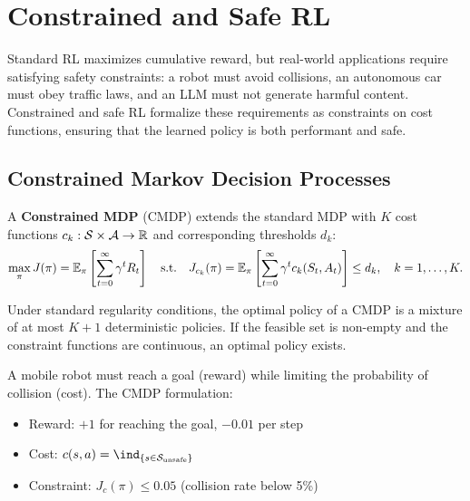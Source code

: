 \chapter{Constrained and Safe RL}
\label{ch:constrained}

\begin{intuition}
Standard RL maximizes cumulative reward, but real-world applications
require satisfying safety constraints: a robot must avoid collisions,
an autonomous car must obey traffic laws, and an LLM must not generate
harmful content. Constrained and safe RL formalize these requirements
as constraints on cost functions, ensuring that the learned policy is
both performant and safe.
\end{intuition}

\section{Constrained Markov Decision Processes}
\label{sec:cmdp}

\begin{definition}
A \textbf{Constrained MDP} (CMDP) extends the standard MDP with $K$
cost functions $c_k: \mathcal{S} \times \mathcal{A} \to \mathbb{R}$ and
corresponding thresholds $d_k$:
\[
    \max_\pi J(\pi) = \mathbb{E}_\pi\left[\sum_{t=0}^{\infty} \gamma^t R_t\right]
    \quad \text{s.t.} \quad
    J_{c_k}(\pi) = \mathbb{E}_\pi\left[\sum_{t=0}^{\infty} \gamma^t c_k(S_t, A_t)\right]
    \leq d_k, \quad k = 1, \ldots, K.
\]
\end{definition}

\begin{theorem}
Under standard regularity conditions, the optimal policy of a CMDP is
a mixture of at most $K+1$ deterministic policies. If the feasible set
is non-empty and the constraint functions are continuous, an optimal
policy exists.
\end{theorem}

\begin{example}
A mobile robot must reach a goal (reward) while limiting the probability
of collision (cost). The CMDP formulation:
\begin{itemize}
    \item Reward: $+1$ for reaching the goal, $-0.01$ per step
    \item Cost: $c(s,a) = \ind_{\{s \in \mathcal{S}_{\text{unsafe}}\}}$
    \item Constraint: $J_c(\pi) \leq 0.05$ (collision rate below 5\%)
\end{itemize}
\end{example}

